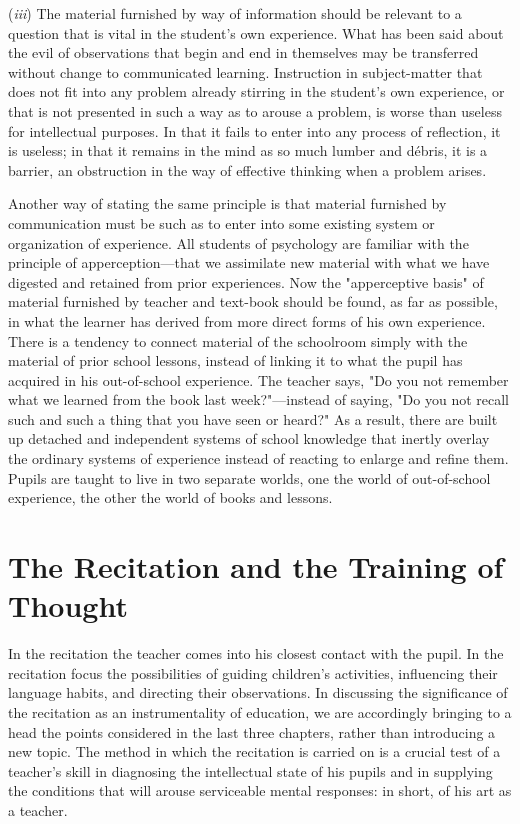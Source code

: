 \documentclass[letterpaper]{book}
\begin{document}

(\emph{iii}) The material furnished by way of information should be
relevant to a question that is vital in the student's own experience.
What has been said about the evil of observations that begin and end in
themselves may be transferred without change to communicated learning.
Instruction in subject-matter that does not fit into any problem already
stirring in the student's own experience, or that is not presented in
such a way as to arouse a problem, is worse than useless for
intellectual purposes. In that it fails to enter into any process of
reflection, it is useless; in that it remains in the mind as so much
lumber and débris, it is a barrier, an obstruction in the way of
effective thinking when a problem arises.


Another way of stating the same principle is that material furnished by
communication must be such as to enter into some existing system or
organization of experience. All students of psychology are familiar with
the principle of apperception---that we assimilate new material with
what we have digested and retained from prior experiences. Now the
"apperceptive basis" of material furnished by teacher and text-book
should be found, as far as possible, in what the learner has derived
from more direct forms of his own experience. There is a tendency to
connect material of the schoolroom simply with the material of prior
school lessons, instead of linking it to what the pupil has acquired in
his out-of-school experience. The teacher says, "Do you not remember
what we learned from the book last week?"---instead of saying, "Do you
not recall such and such a thing that you have seen or heard?" As a
result, there are built up detached and independent systems of school
knowledge that inertly overlay
the
ordinary systems of experience instead of reacting to enlarge and refine
them. Pupils are taught to live in two separate worlds, one the world of
out-of-school experience, the other the world of books and
lessons.

\chapter{The Recitation and the Training of Thought}


In the recitation the teacher comes into his closest contact with the
pupil. In the recitation focus the possibilities of guiding children's
activities, influencing their language habits, and directing their
observations. In discussing the significance of the recitation as an
instrumentality of education, we are accordingly bringing to a head the
points considered in the last three chapters, rather than introducing a
new topic. The method in which the recitation is carried on is a crucial
test of a teacher's skill in diagnosing the intellectual state of his
pupils and in supplying the conditions that will arouse serviceable
mental responses: in short, of his art as a teacher.
\end{document}
